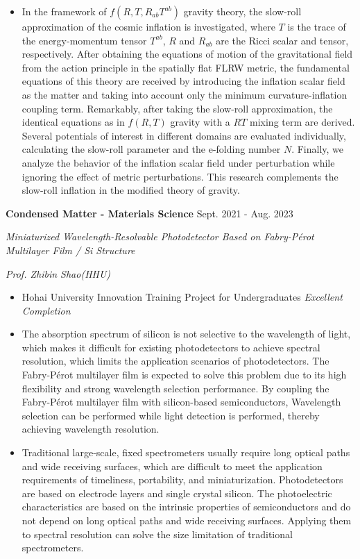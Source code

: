 \documentclass[12pt]{article}
\begin{document}
\begin{itemize}[noitemsep,nolistsep]
    \item In the framework of $f\left(R, T, R_{ab}T^{ab}\right)$ gravity theory, the slow-roll approximation of the cosmic inflation is investigated, where $T$ is the trace of the energy-momentum tensor $T^{ab}$, $R$ and $R_{ab}$ are the Ricci scalar and tensor, respectively. After obtaining the equations of motion of the gravitational field from the action principle in the spatially flat FLRW metric, the fundamental equations of this theory are received by introducing the inflation scalar field as the matter and taking into account only the minimum curvature-inflation coupling term. Remarkably, after taking the slow-roll approximation, the identical equations as in $f(R, T)$ gravity with a $RT$ mixing term are derived. Several potentials of interest in different domains are evaluated individually, calculating the slow-roll parameter and the e-folding number $N$. Finally, we analyze the behavior of the inflation scalar field under perturbation while ignoring the effect of metric perturbations. This research complements the slow-roll inflation in the modified theory of gravity.
\end{itemize}

\medskip \textbf{Condensed Matter - Materials Science} \hfill Sept. 2021 - Aug. 2023

\quad \textit{Miniaturized Wavelength-Resolvable Photodetector Based on Fabry-P\'{e}rot Multilayer Film / Si Structure}

\hfill \textit{Prof. Zhibin Shao(HHU)}

\begin{itemize}[noitemsep,nolistsep]
    \item Hohai University Innovation Training Project for Undergraduates \textit{Excellent Completion}
    \item The absorption spectrum of silicon is not selective to the wavelength of light, which makes it difficult for existing photodetectors to achieve spectral resolution, which limits the application scenarios of photodetectors. The Fabry-P\'{e}rot multilayer film is expected to solve this problem due to its high flexibility and strong wavelength selection performance. By coupling the Fabry-P\'{e}rot multilayer film with silicon-based semiconductors, Wavelength selection can be performed while light detection is performed, thereby achieving wavelength resolution.
    \item Traditional large-scale, fixed spectrometers usually require long optical paths and wide receiving surfaces, which are difficult to meet the application requirements of timeliness, portability, and miniaturization. Photodetectors are based on electrode layers and single crystal silicon. The photoelectric characteristics are based on the intrinsic properties of semiconductors and do not depend on long optical paths and wide receiving surfaces. Applying them to spectral resolution can solve the size limitation of traditional spectrometers.
\end{itemize}
\end{document}

